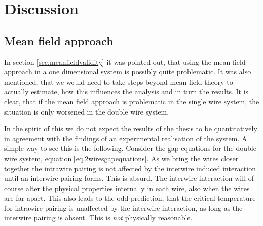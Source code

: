 \chapter{Discussion} %

\label{Chapter13} %

\section{Mean field approach} \label{sec.Discussion.meanfieldapproach}
In section \ref{sec.meanfieldvalidity} it was pointed out, that using the mean field approach in a one dimensional system is possibly quite problematic. It was also mentioned, that we would need to take steps beyond mean field theory to actually estimate, how this influences the analysis and in turn the results. It is clear, that if the mean field approach is problematic in the single wire system, the situation is only worsened in the double wire system. 

In the spirit of this we do not expect the results of the thesis to be quantitatively in agreement with the findings of an experimental realisation of the system. A simple way to see this is the following. Consider the gap equations for the double wire system, equation \eqref{eq.2wiresgapequations}. As we bring the wires closer together the intrawire pairing is not affected by the interwire induced interaction until an interwire pairing forms. This is absurd. The interwire interaction will of course alter the physical properties internally in each wire, also when the wires are far apart. This also leads to the odd prediction, that the critical temperature for intrawire pairing is unaffected by the interwire interaction, as long as the interwire pairing is absent. This is \textit{not} physically reasonable. 

